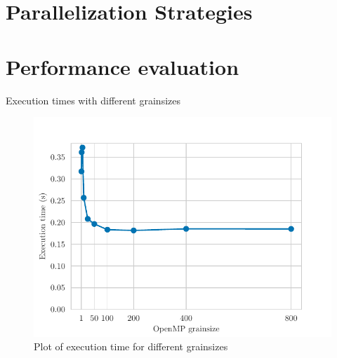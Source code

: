 
\section{Parallelization Strategies}%
\label{sec:Parallelization Strategies}





\section{Performance evaluation}%
\label{sec:Performance evaluation}


\begin{table}[H]
    \caption{Execution times with different grainsizes}%
    \label{tab:grainsize}
    \begin{center}
    
    \end{center}
\end{table}

\begin{figure}[H]
    \centering
    \includegraphics{plots/grainsize.pdf}
    \caption{Plot of execution time for different grainsizes}
    \label{fig:grain} 
\end{figure}

